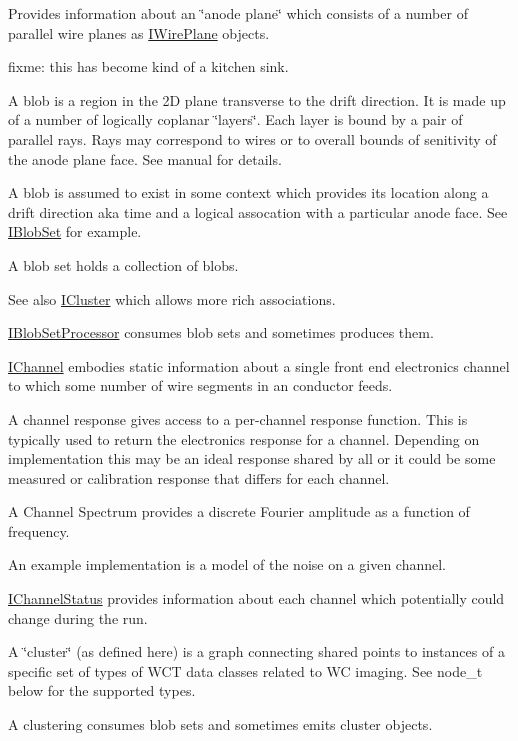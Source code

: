 Provides information about an \char`\"{}anode plane\char`\"{} which consists of a number of parallel wire planes as \hyperlink{class_wire_cell_1_1_i_wire_plane}{I\+Wire\+Plane} objects.

fixme\+: this has become kind of a kitchen sink.

A blob is a region in the 2D plane transverse to the drift direction. It is made up of a number of logically coplanar \char`\"{}layers\char`\"{}. Each layer is bound by a pair of parallel rays. Rays may correspond to wires or to overall bounds of senitivity of the anode plane face. See manual for details.

A blob is assumed to exist in some context which provides its location along a drift direction aka time and a logical assocation with a particular anode face. See \hyperlink{class_wire_cell_1_1_i_blob_set}{I\+Blob\+Set} for example.

A blob set holds a collection of blobs.

See also \hyperlink{class_wire_cell_1_1_i_cluster}{I\+Cluster} which allows more rich associations.

\hyperlink{class_wire_cell_1_1_i_blob_set_processor}{I\+Blob\+Set\+Processor} consumes blob sets and sometimes produces them.

\hyperlink{class_wire_cell_1_1_i_channel}{I\+Channel} embodies static information about a single front end electronics channel to which some number of wire segments in an conductor feeds.

A channel response gives access to a per-\/channel response function. This is typically used to return the electronics response for a channel. Depending on implementation this may be an ideal response shared by all or it could be some measured or calibration response that differs for each channel.

A Channel Spectrum provides a discrete Fourier amplitude as a function of frequency.

An example implementation is a model of the noise on a given channel.

\hyperlink{class_wire_cell_1_1_i_channel_status}{I\+Channel\+Status} provides information about each channel which potentially could change during the run.

A \char`\"{}cluster\char`\"{} (as defined here) is a graph connecting shared points to instances of a specific set of types of W\+CT data classes related to WC imaging. See node\+\_\+t below for the supported types.

A clustering consumes blob sets and sometimes emits cluster objects.

